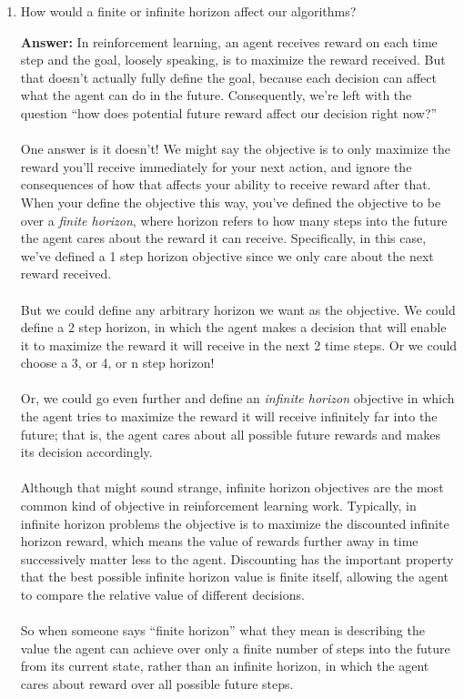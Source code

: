 \documentclass{article}
\newenvironment{QandA}{\begin{enumerate}[label=\arabic*.]}{\end{enumerate}}
\newenvironment{answer}{\par\normalfont \textbf{Answer:}}{}
\begin{document}
\begin{QandA}
    \item How would a finite or infinite horizon affect our algorithms?
    \begin{answer}
        In reinforcement learning, an agent receives reward on each time step and the goal, loosely speaking, is to maximize the reward received. But that doesn’t actually fully define the goal, because each decision can affect what the agent can do in the future. Consequently, we’re left with the question “how does potential future reward affect our decision right now?”\\\\
        One answer is it doesn’t! We might say the objective is to only maximize the reward you’ll receive immediately for your next action, and ignore the consequences of how that affects your ability to receive reward after that. When your define the objective this way, you’ve defined the objective to be over a \textit{finite horizon}, where horizon refers to how many steps into the future the agent cares about the reward it can receive. Specifically, in this case, we’ve defined a 1 step horizon objective since we only care about the next reward received.\\\\
        But we could define any arbitrary horizon we want as the objective. We could define a 2 step horizon, in which the agent makes a decision that will enable it to maximize the reward it will receive in the next 2 time steps. Or we could choose a 3, or 4, or n step horizon!\\\\
        Or, we could go even further and define an \textit{infinite horizon} objective in which the agent tries to maximize the reward it will receive infinitely far into the future; that is, the agent cares about all possible future rewards and makes its decision accordingly. \\\\
        Although that might sound strange, infinite horizon objectives are the most common kind of objective in reinforcement learning work. Typically, in infinite horizon problems the objective is to maximize the discounted infinite horizon reward, which means the value of rewards further away in time successively matter less to the agent. Discounting has the important property that the best possible infinite horizon value is finite itself, allowing the agent to compare the relative value of different decisions.\\\\
        So when someone says “finite horizon” what they mean is describing the value the agent can achieve over only a finite number of steps into the future from its current state, rather than an infinite horizon, in which the agent cares about reward over all possible future steps.


\end{answer}
\end{QandA}
\end{document}
